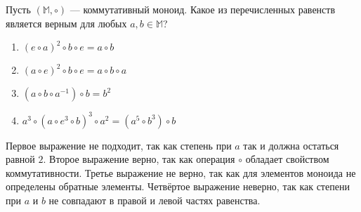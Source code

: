 \begin{task}
    Пусть $(\mathbb{M}, \circ)$ --- коммутативный моноид. Какое из перечисленных равенств является верным для любых $a,b\in \mathbb{M}$?
    \begin{enumerate}
        \item $(e \circ a)^2 \circ b \circ e = a \circ b$
        \item $(a \circ e)^2 \circ b \circ e = a \circ b \circ a$
        \item $(a \circ b \circ a^{-1})\circ b = b^2$
        \item $a^3 \circ (a \circ e^3 \circ b)^3 \circ a^2 = (a^5 \circ b^3) \circ b$
    \end{enumerate}

    \begin{solution}
        Первое выражение не подходит, так как степень при $a$ так и должна остаться равной $2$. Второе выражение верно, так как операция $\circ$ обладает свойством коммутативности. Третье выражение не верно, так как для элементов моноида не определены обратные элементы. Четвёртое выражение неверно, так как степени при $a$ и $b$ не совпадают в правой и левой частях равенства.
    \end{solution}
\end{task}

